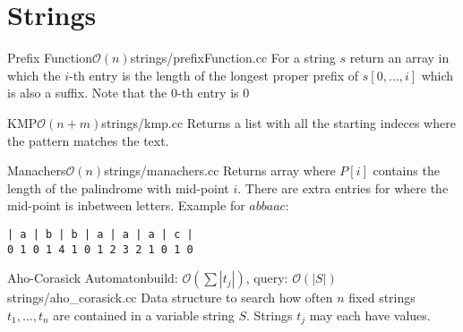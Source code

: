 \section{Strings}

\begin{code}{Prefix Function}{$\mathcal{O}(n)$}{strings/prefixFunction.cc}
  For a string $s$ return an array in which the $i$-th entry is the
  length of the longest proper prefix of $s[0,\ldots, i]$ which is also
  a suffix.  Note that the $0$-th entry is $0$
\end{code}

\begin{code}{KMP}{$\mathcal{O}(n + m)$}{strings/kmp.cc}
  Returns a list with all the starting indeces where the pattern matches
  the text.
\end{code}

\begin{code}{Manachers}{$\mathcal{O}(n)$}{strings/manachers.cc}
Returns array where $P[i]$ contains the length of the palindrome with
mid-point $i$. There are extra entries for where the mid-point is
inbetween letters. Example for $abbaac$:
\begin{verbatim}
| a | b | b | a | a | a | c |
0 1 0 1 4 1 0 1 2 3 2 1 0 1 0
\end{verbatim}
\end{code}

\begin{code}{Aho-Corasick Automaton}{build: $\mathcal{O}(\sum |t_j|)$, query: $\mathcal{O}(|S|)$}{strings/aho_corasick.cc}
  Data structure to search how often $n$ fixed strings $t_1, \dots, t_n$
  are contained in a variable string $S$. Strings $t_j$ may each have
  values.
\end{code}


